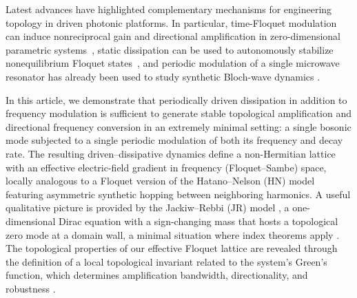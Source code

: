 \documentclass[a4paper,twocolumn,floatfix,10pt,superscriptaddress]%
{quantumarticle}
\begin{document}
Latest advances have highlighted complementary mechanisms for engineering topology in driven photonic platforms. In particular, time-Floquet modulation can induce nonreciprocal gain and directional amplification in zero-dimensional parametric systems~\cite{Koutserimpas2018}, static dissipation can be used to autonomously stabilize nonequilibrium Floquet states~\cite{Ritter2024}, and periodic modulation of a single microwave resonator has already been used to study synthetic Bloch-wave dynamics \cite{Ahrens2025}. 

In this article, we demonstrate that periodically driven dissipation in addition to frequency modulation is sufficient to generate stable topological amplification and directional frequency conversion in an extremely minimal setting: a single bosonic mode subjected to a single periodic modulation of both its frequency and decay rate. The resulting driven–dissipative dynamics define a non-Hermitian lattice with an effective electric-field gradient in frequency (Floquet–Sambe) space, locally analogous to a Floquet version of the Hatano–Nelson (HN) model \cite{Hatano1996} featuring asymmetric synthetic hopping between neighboring harmonics. A useful qualitative picture is provided by the Jackiw–Rebbi (JR) model \cite{Jackiw1976}, a one-dimensional Dirac equation with a sign-changing mass that hosts a topological zero mode at a domain wall, a minimal situation where index theorems apply \cite{AtiyahSinger1963,Callias1978}. The topological properties of our effective Floquet lattice are revealed through the definition of a local topological invariant related to the system’s Green’s function, which determines amplification bandwidth, directionality, and robustness \cite{yao2017topological,Yao2018}.
\end{document}
